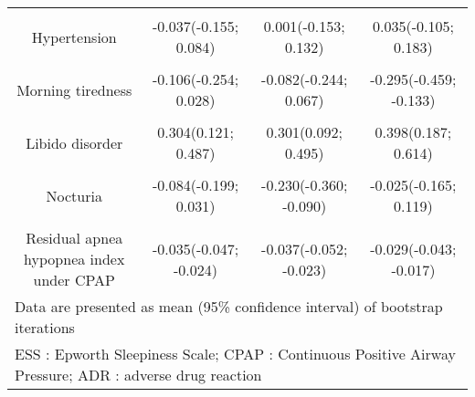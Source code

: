 \documentclass{article}
\begin{document}
\begin{table}[H]
\begin{tabular}[t]{cccc}
\cellcolor{gray!6}{Gender (male)} & \cellcolor{gray!6}{-0.002(-0.152; 0.145)} & \cellcolor{gray!6}{0.073(-0.090; 0.231)} & \cellcolor{gray!6}{-0.016(-0.194; 0.152)}\\
Hypertension & -0.037(-0.155; 0.084) & 0.001(-0.153; 0.132) & 0.035(-0.105; 0.183)\\
\cellcolor{gray!6}{Restless legs syndrome} & \cellcolor{gray!6}{0.146(0.005; 0.288)} & \cellcolor{gray!6}{0.069(-0.099; 0.243)} & \cellcolor{gray!6}{0.020(-0.155; 0.183)}\\
Morning tiredness & -0.106(-0.254; 0.028) & -0.082(-0.244; 0.067) & -0.295(-0.459; -0.133)\\
\cellcolor{gray!6}{Morning headaches} & \cellcolor{gray!6}{0.056(-0.106; 0.208)} & \cellcolor{gray!6}{0.052(-0.116; 0.228)} & \cellcolor{gray!6}{-0.093(-0.290; 0.108)}\\
Libido disorder & 0.304(0.121; 0.487) & 0.301(0.092; 0.495) & 0.398(0.187; 0.614)\\
\cellcolor{gray!6}{Night sweating} & \cellcolor{gray!6}{-0.084(-0.236; 0.068)} & \cellcolor{gray!6}{-0.137(-0.321; 0.034)} & \cellcolor{gray!6}{-0.255(-0.446; -0.065)}\\
Nocturia & -0.084(-0.199; 0.031) & -0.230(-0.360; -0.090) & -0.025(-0.165; 0.119)\\
\cellcolor{gray!6}{Pichot's fatigue scale} & \cellcolor{gray!6}{-0.040(-0.050; -0.031)} & \cellcolor{gray!6}{-0.061(-0.073; -0.051)} & \cellcolor{gray!6}{-0.045(-0.057; -0.033)}\\
Residual apnea  hypopnea index under CPAP & -0.035(-0.047; -0.024) & -0.037(-0.052; -0.023) & -0.029(-0.043; -0.017)\\
\bottomrule
\multicolumn{4}{l}{\rule{0pt}{1em}Data are presented as mean (95\% confidence interval) of bootstrap iterations}\\
\multicolumn{4}{l}{\rule{0pt}{1em}ESS : Epworth Sleepiness Scale; CPAP : Continuous Positive Airway Pressure; ADR : adverse drug reaction}\\
\end{tabular}
\end{table}
\clearpage
\end{document}
